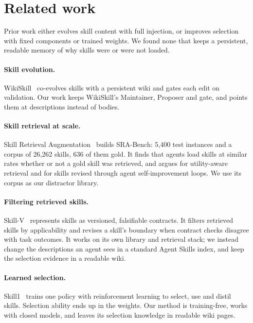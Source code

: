 \documentclass[11pt]{article}
\begin{document}
\section{Related work}
\label{sec:related}

Prior work either evolves skill content with full injection, or improves selection with fixed components or trained weights. We found none that keeps a persistent, readable memory of why skills were or were not loaded.

\paragraph{Skill evolution.} WikiSkill~\cite{tang2026wikiskill} co-evolves skills with a persistent wiki and gates each edit on validation. Our work keeps WikiSkill's Maintainer, Proposer and gate, and points them at descriptions instead of bodies.

\paragraph{Skill retrieval at scale.} Skill Retrieval Augmentation~\cite{su2026sra} builds SRA-Bench: 5,400 test instances and a corpus of 26,262 skills, 636 of them gold. It finds that agents load skills at similar rates whether or not a gold skill was retrieved, and argues for utility-aware retrieval and for skills revised through agent self-improvement loops. We use its corpus as our distractor library.

\paragraph{Filtering retrieved skills.} Skill-V~\cite{ma2026skillv} represents skills as versioned, falsifiable contracts. It filters retrieved skills by applicability and revises a skill's boundary when contract checks disagree with task outcomes. It works on its own library and retrieval stack; we instead change the descriptions an agent sees in a standard Agent Skills index, and keep the selection evidence in a readable wiki.

\paragraph{Learned selection.} Skill1~\cite{shi2026skill1} trains one policy with reinforcement learning to select, use and distil skills. Selection ability ends up in the weights. Our method is training-free, works with closed models, and leaves its selection knowledge in readable wiki pages.
\end{document}
